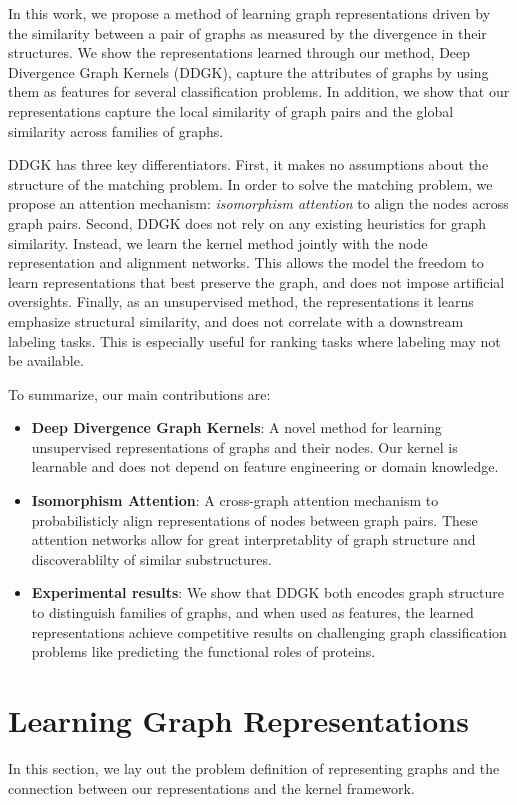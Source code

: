 \documentclass[sigconf]{acmart}
\newcommand{\ours}{\textsc{DDGK}}
\begin{document}
In this work, we propose a method of learning graph representations driven by the similarity between a pair of graphs as measured by the divergence in their structures.
We show the representations learned through our method, Deep Divergence Graph Kernels (\ours{}), capture the attributes of graphs by using them as features for several classification problems.
In addition, we show that our representations capture the local similarity of graph pairs and the global similarity across families of graphs.

\ours{} has three key differentiators.
First, it makes no assumptions about the structure of the matching problem. 
In order to solve the matching problem, we propose an attention mechanism: \emph{isomorphism attention} to align the nodes across graph pairs.
Second, \ours{} does not rely on any existing heuristics for graph similarity.
Instead, we learn the kernel method jointly with the node representation and alignment networks.
This allows the model the freedom to learn representations that best preserve the graph, and does not impose artificial oversights.
Finally, as an unsupervised method, the representations it learns emphasize structural similarity, and does not correlate with a downstream labeling tasks.
This is especially useful for ranking tasks where labeling may not be available.

\noindent To summarize, our main contributions are:
\begin{itemize}
\item \textbf{Deep Divergence Graph Kernels}: A novel method for learning unsupervised representations of graphs and their nodes.
Our kernel is learnable and does not depend on feature engineering or domain knowledge. 
\item \textbf{Isomorphism Attention}:  A cross-graph attention mechanism to probabilisticly align representations of nodes between graph pairs.
These attention networks allow for great interpretablity of graph structure and discoverablilty of similar substructures.
\item \textbf{Experimental results}: We show that \ours{} both encodes graph structure to distinguish families of graphs, and when used as features, the learned representations achieve competitive results on challenging graph classification problems like predicting the functional roles of proteins.
\end{itemize}

\section{Learning Graph Representations}
In this section, we lay out the problem definition of representing graphs and the connection between our representations and the kernel framework.
\end{document}
